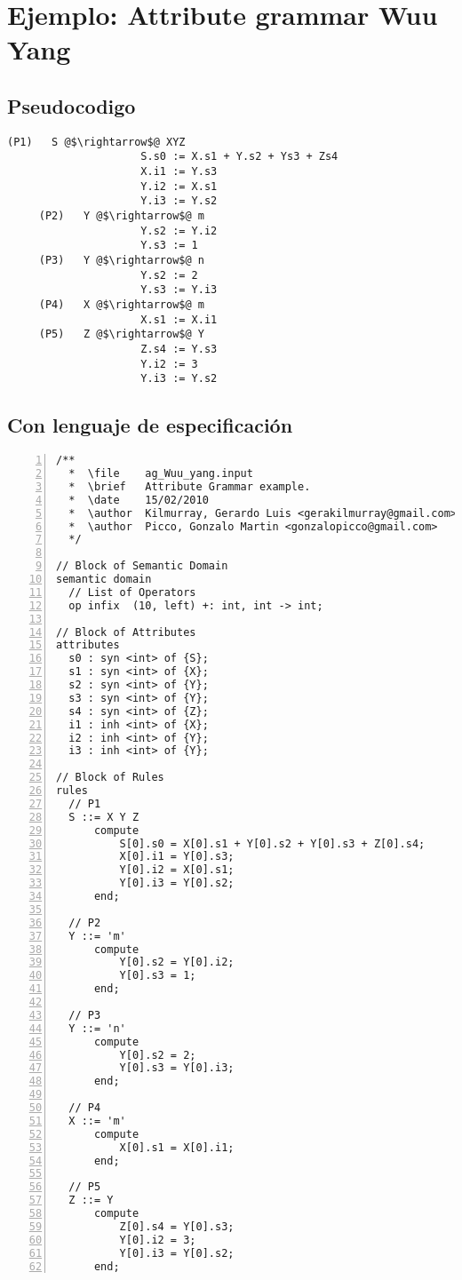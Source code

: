 \section{Ejemplo: Attribute grammar Wuu Yang}
\label{append:agwuuyang}
\scriptsize
\subsection{Pseudocodigo}
\begin{lstlisting}[escapeinside=@@, backgroundcolor=\color{white}]
     (P1)   S @$\rightarrow$@ XYZ      
                     S.s0 := X.s1 + Y.s2 + Ys3 + Zs4
                     X.i1 := Y.s3  
                     Y.i2 := X.s1
                     Y.i3 := Y.s2
     (P2)   Y @$\rightarrow$@ m        
                     Y.s2 := Y.i2
                     Y.s3 := 1
     (P3)   Y @$\rightarrow$@ n        
                     Y.s2 := 2
                     Y.s3 := Y.i3
     (P4)   X @$\rightarrow$@ m        
                     X.s1 := X.i1
     (P5)   Z @$\rightarrow$@ Y        
                     Z.s4 := Y.s3
                     Y.i2 := 3
                     Y.i3 := Y.s2
\end{lstlisting} 

\subsection{Con lenguaje de especificación}
\scriptsize
\begin{lstlisting}[numbers=left, numberstyle=\tiny, numbersep=5pt, language=cobol ]
/**
  *  \file    ag_Wuu_yang.input
  *  \brief   Attribute Grammar example.
  *  \date    15/02/2010
  *  \author  Kilmurray, Gerardo Luis <gerakilmurray@gmail.com>
  *  \author  Picco, Gonzalo Martin <gonzalopicco@gmail.com>
  */

// Block of Semantic Domain
semantic domain
  // List of Operators 
  op infix  (10, left) +: int, int -> int;

// Block of Attributes
attributes
  s0 : syn <int> of {S};
  s1 : syn <int> of {X};
  s2 : syn <int> of {Y};
  s3 : syn <int> of {Y};
  s4 : syn <int> of {Z};
  i1 : inh <int> of {X};
  i2 : inh <int> of {Y};
  i3 : inh <int> of {Y};

// Block of Rules
rules
  // P1
  S ::= X Y Z
      compute  
          S[0].s0 = X[0].s1 + Y[0].s2 + Y[0].s3 + Z[0].s4;
          X[0].i1 = Y[0].s3;
          Y[0].i2 = X[0].s1;
          Y[0].i3 = Y[0].s2;
      end;

  // P2
  Y ::= 'm'
      compute
          Y[0].s2 = Y[0].i2;
          Y[0].s3 = 1;
      end;

  // P3
  Y ::= 'n'
      compute
          Y[0].s2 = 2;
          Y[0].s3 = Y[0].i3;
      end;

  // P4
  X ::= 'm'
      compute
          X[0].s1 = X[0].i1;
      end;
  
  // P5
  Z ::= Y
      compute
          Z[0].s4 = Y[0].s3;
          Y[0].i2 = 3;
          Y[0].i3 = Y[0].s2;
      end;           
\end{lstlisting}
